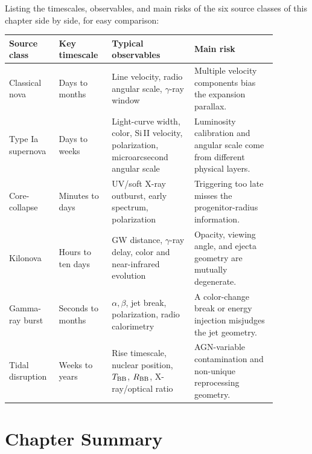 Listing the timescales, observables, and main risks of the six source classes of this chapter side by side, for easy comparison:
\begin{longtable}{@{}p{0.14\linewidth}p{0.18\linewidth}p{0.28\linewidth}p{0.28\linewidth}@{}}
\toprule
Source class & Key timescale & Typical observables & Main risk \\
\midrule
Classical nova & Days to months & Line velocity, radio angular scale, \(\gamma\)-ray window & Multiple velocity components bias the expansion parallax. \\
Type Ia supernova & Days to weeks & Light-curve width, color, Si\,II velocity, polarization, microarcsecond angular scale & Luminosity calibration and angular scale come from different physical layers. \\
Core-collapse & Minutes to days & UV/soft X-ray outburst, early spectrum, polarization & Triggering too late misses the progenitor-radius information. \\
Kilonova & Hours to ten days & GW distance, \(\gamma\)-ray delay, color and near-infrared evolution & Opacity, viewing angle, and ejecta geometry are mutually degenerate. \\
Gamma-ray burst & Seconds to months & \(\alpha,\beta\), jet break, polarization, radio calorimetry & A color-change break or energy injection misjudges the jet geometry. \\
Tidal disruption & Weeks to years & Rise timescale, nuclear position, \(T_{\rm BB}\), \(R_{\rm BB}\), X-ray/optical ratio & AGN-variable contamination and non-unique reprocessing geometry. \\
\bottomrule
\end{longtable}

\section*{Chapter Summary}

